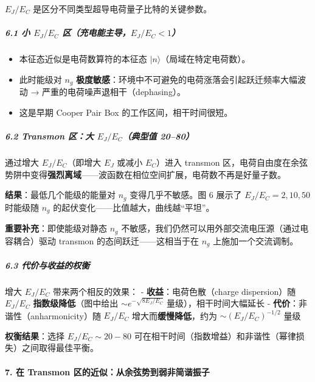 \documentclass[12pt,a4paper,oneside]{ctexbook}
\providecommand{\tightlist}{%
  \setlength{\itemsep}{0pt}\setlength{\parskip}{0pt}}
\let\oldparagraph\paragraph
\renewcommand{\paragraph}[1]{\oldparagraph{#1}\mbox{}}
\let\oldsubparagraph\subparagraph
\renewcommand{\subparagraph}[1]{\oldsubparagraph{#1}\mbox{}}
\begin{document}
\(E_J/E_C\) 是区分不同类型超导电荷量子比特的关键参数。

\subparagraph{\texorpdfstring{6.1 小 \(E_J/E_C\)
区（充电能主导，\(E_J/E_C < 1\)）}{6.1 小 E\_J/E\_C 区（充电能主导，E\_J/E\_C \textless{} 1）}}\label{ux5c0f-e_je_c-ux533aux5145ux7535ux80fdux4e3bux5bfce_je_c-1}

\begin{itemize}
\tightlist
\item
  本征态近似是电荷数算符的本征态 \(|n\rangle\)（局域在特定电荷数）。
\item
  此时能级对 \(n_g\)
  \textbf{极度敏感}：环境中不可避免的电荷涨落会引起跃迁频率大幅波动 →
  严重的电荷噪声退相干（dephasing）。
\item
  这是早期 Cooper Pair Box 的工作区间，相干时间很短。
\end{itemize}

\subparagraph{\texorpdfstring{6.2 Transmon 区：大 \(E_J/E_C\)（典型值
20--80）}{6.2 Transmon 区：大 E\_J/E\_C（典型值 20--80）}}\label{transmon-ux533aux5927-e_je_cux5178ux578bux503c-2080}

通过增大 \(E_J/E_C\)（即增大 \(E_J\) 或减小 \(E_C\)）进入 transmon
区，电荷自由度在余弦势阱中变得\textbf{强烈离域}------波函数在相位空间扩展，电荷数不再是好量子数。

\textbf{结果}：最低几个能级的能量对 \(n_g\) 变得几乎不敏感。图 6 展示了
\(E_J/E_C = 2,10,50\) 时能级随 \(n_g\)
的起伏变化------比值越大，曲线越``平坦''。

\textbf{重要补充}：即使能级对静态 \(n_g\)
不敏感，我们仍然可以用外部交流电压源（通过电容耦合）驱动 transmon
的态间跃迁------这相当于在 \(n_g\) 上施加一个交流调制。

\subparagraph{6.3
代价与收益的权衡}\label{ux4ee3ux4ef7ux4e0eux6536ux76caux7684ux6743ux8861}

增大 \(E_J/E_C\) 带来两个相反的效果： - \textbf{收益}：电荷色散（charge
dispersion）随 \(E_J/E_C\) \textbf{指数级降低}（图中给出
\(\sim e^{-\sqrt{8E_J/E_C}}\) 量级），相干时间大幅延长 -
\textbf{代价}：非谐性（anharmonicity）随 \(E_J/E_C\)
增大而\textbf{缓慢降低}，约为 \(\sim (E_J/E_C)^{-1/2}\) 量级

\textbf{权衡结果}：选择 \(E_J/E_C \sim 20-80\)
可在相干时间（指数增益）和非谐性（幂律损失）之间取得最佳平衡。


\paragraph{7. 在 Transmon
区的近似：从余弦势到弱非简谐振子}\label{ux5728-transmon-ux533aux7684ux8fd1ux4f3cux4eceux4f59ux5f26ux52bfux5230ux5f31ux975eux7b80ux8c10ux632fux5b50}
\end{document}
